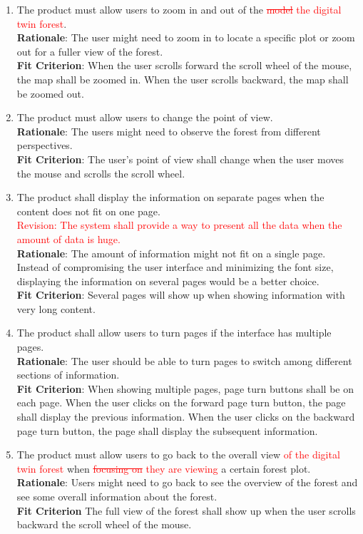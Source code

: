 \documentclass{article}
\begin{document}
\begin{enumerate}[FR1]
	\item The product must allow users to zoom in and out of the \textcolor{red}{\st{model} the 
	digital twin forest}.\\
	\textbf{Rationale}: The user might need to zoom in to locate a specific plot or zoom out for a fuller view of the forest. \\
	\textbf{Fit Criterion}: When the user scrolls forward the scroll wheel of the mouse, the map shall be zoomed in. When the user scrolls backward, the map shall be zoomed out. 
	
	\item The product must allow users to change the point of view. \\
	\textbf{Rationale}: The users might need to observe the forest from different perspectives.\\
	\textbf{Fit Criterion}: The user's point of view shall change when the user moves the mouse and scrolls the scroll wheel.
	
	\item The product shall display the information on separate pages when the content does not fit on
	 one page.\\
	 \textcolor{red}{Revision: The system shall provide a way to present all the data when the 
	 amount of data is huge.}\\
	\textbf{Rationale}: The amount of information might not fit on a single page. Instead of
	 compromising the user interface and minimizing the font size, displaying the information on
	  several pages would be a better choice.\\
	\textbf{Fit Criterion}: Several pages will show up when showing information with very long content.
	
	\item The product shall allow users to turn pages if the interface has multiple pages. \\
	\textbf{Rationale}: The user should be able to turn pages to switch among different sections of information.\\
	\textbf{Fit Criterion}: When showing multiple pages, page turn buttons shall be on each page. When the user clicks on the forward page turn button, the page shall display the previous information. When the user clicks on the backward page turn button, the page shall display the subsequent information.
	
	\item The product must allow users to go back to the overall view \textcolor{red}{of the digital
	twin forest} when \textcolor{red}{\st{focusing on} they are viewing} a certain forest plot.\\
	\textbf{Rationale}: Users might need to go back to see the overview of the forest and see some
	 overall information about the forest.  \\
	\textbf{Fit Criterion} The full view of the forest shall show up when the user scrolls backward the
	 scroll wheel of the mouse.
	

\end{enumerate}
\end{document}
